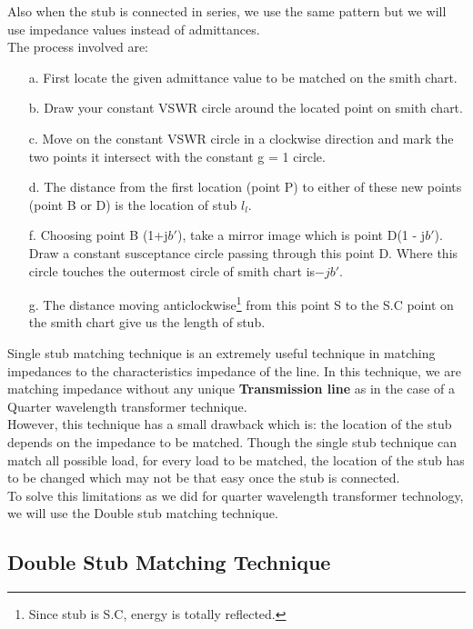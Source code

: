 Also when the stub is connected in series, we use the same pattern but we will use impedance values instead of admittances.\\
The process involved are:\\
\begin{itemize}
\item[a.]First locate the given admittance value to be matched on the smith chart.
\item[b.]Draw your constant VSWR circle  around the located point on smith chart.
\item[c.] Move on the constant VSWR circle in a clockwise direction and mark the two points it intersect with the constant g = 1 circle.
\item[d.]The distance from the first location (point P) to either of these new points (point B or D) is the location of stub $l_l$.
\item[f.] Choosing point B (1+j$b'$), take a mirror image which is point D(1 - j$b'$). Draw a constant susceptance circle passing through this point D. Where this circle touches the outermost circle of smith chart is$ -jb'$.
\item[g.] The distance moving anticlockwise\footnote{Since stub is S.C, energy is totally reflected.} from this point S to the S.C point on the smith chart give us the length of stub.
\end{itemize}

Single stub matching technique is an extremely useful technique in matching impedances to the characteristics impedance of the line. In this technique, we are matching impedance without any unique \textbf{Transmission line} as in the case of a Quarter wavelength transformer technique.\\

However, this technique has a small drawback which is: the location of the stub  depends on the impedance to be matched. Though the single stub technique can match all possible load, for every load to be matched, the location of the stub has to be changed which may not be that easy once the stub is connected.\\

To solve this limitations as we did for quarter wavelength transformer technology, we will use the Double stub matching technique.
\subsection{Double Stub Matching Technique}

